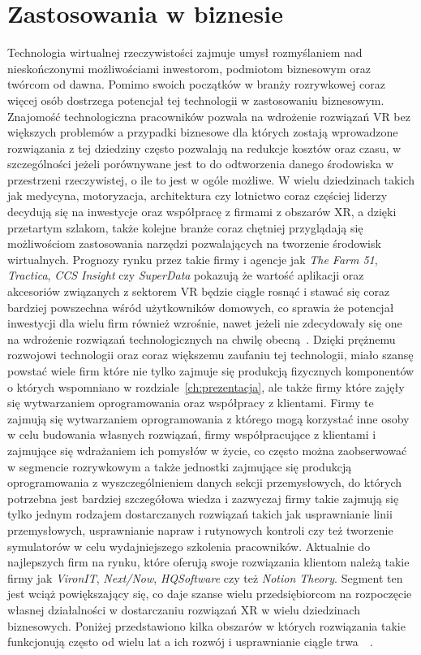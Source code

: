 \chapter{Zastosowania w biznesie}
\label{ch:biznes}
 Technologia wirtualnej rzeczywistości zajmuje umysł rozmyślaniem nad nieskończonymi możliwościami inwestorom, podmiotom biznesowym oraz twórcom od  dawna. Pomimo swoich początków w branży rozrywkowej coraz więcej osób dostrzega potencjał tej technologii w zastosowaniu biznesowym. Znajomość technologiczna pracowników pozwala na wdrożenie rozwiązań VR bez większych problemów a przypadki biznesowe dla których zostają wprowadzone rozwiązania z tej dziedziny często pozwalają na redukcje kosztów oraz czasu, w szczególności jeżeli porównywane jest to do odtworzenia danego środowiska w przestrzeni rzeczywistej, o ile to jest w ogóle możliwe. W wielu dziedzinach takich jak medycyna, motoryzacja, architektura czy lotnictwo coraz częściej liderzy decydują się na inwestycje oraz współpracę z firmami z obszarów XR, a dzięki przetartym szlakom, także kolejne branże coraz chętniej przyglądają się możliwościom zastosowania narzędzi pozwalających na tworzenie środowisk wirtualnych. Prognozy rynku przez takie firmy i agencje jak \textit{The Farm 51}, \textit{Tractica}, \textit{CCS Insight} czy \textit{SuperData} pokazują że wartość aplikacji oraz akcesoriów związanych z sektorem VR będzie ciągle rosnąć i stawać się coraz bardziej powszechna wśród użytkowników domowych, co sprawia że potencjał inwestycji dla wielu firm również wzrośnie, nawet jeżeli nie zdecydowały się one na wdrożenie rozwiązań technologicznych na chwilę obecną~\cite{raportVR}. Dzięki prężnemu rozwojowi technologii oraz coraz większemu zaufaniu tej technologii, miało szansę powstać wiele firm które nie tylko zajmuje się produkcją fizycznych komponentów o których wspomniano w rozdziale~\ref{ch:prezentacja}, ale także firmy które zajęły się wytwarzaniem oprogramowania oraz współpracy z klientami. Firmy te zajmują się wytwarzaniem oprogramowania z którego mogą korzystać inne osoby w celu budowania własnych rozwiązań, firmy współpracujące z klientami i zajmujące się wdrażaniem ich pomysłów w życie, co często można zaobserwować w segmencie rozrywkowym a także jednostki zajmujące się produkcją oprogramowania z wyszczególnieniem danych sekcji przemysłowych, do których potrzebna jest bardziej szczegółowa wiedza i zazwyczaj firmy takie zajmują się tylko jednym rodzajem dostarczanych rozwiązań takich jak usprawnianie linii przemysłowych, usprawnianie napraw i rutynowych kontroli czy też tworzenie symulatorów w celu wydajniejszego szkolenia pracowników. Aktualnie do najlepszych firm na rynku, które oferują swoje rozwiązania klientom należą takie firmy jak \textit{VironIT}, \textit{Next/Now}, \textit{HQSoftware} czy też \textit{Notion Theory}. Segment ten jest wciąż powiększający się, co daje szanse wielu przedsiębiorcom na rozpoczęcie własnej działalności w dostarczaniu rozwiązań XR w wielu dziedzinach biznesowych. Poniżej przedstawiono kilka obszarów w których rozwiązania takie funkcjonują często od wielu lat a ich rozwój i usprawnianie ciągle trwa~\cite{firmy}~\cite{vr4bus}.
 
